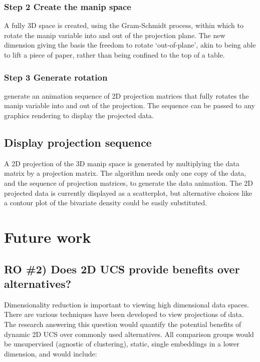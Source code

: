 \documentclass{monashthesis}
\begin{document}
\subsection{Step 2 Create the manip
space}\label{step-2-create-the-manip-space}

A fully 3D space is created, using the Gram-Schmidt process, within
which to rotate the manip variable into and out of the projection plane.
The new dimension giving the basis the freedom to rotate `out-of-plane',
akin to being able to lift a piece of paper, rather than being confined
to the top of a table.

\subsection{Step 3 Generate rotation}\label{step-3-generate-rotation}

generate an animation sequence of 2D projection matrices that fully
rotates the manip variable into and out of the projection. The sequence
can be passed to any graphics rendering to display the projected data.

\section{Display projection sequence}\label{display-projection-sequence}

A 2D projection of the 3D manip space is generated by multiplying the
data matrix by a projection matrix. The algorithm needs only one copy of
the data, and the sequence of projection matrices, to generate the data
animation. The 2D projected data is currently displayed as a
scatterplot, but alternative choices like a contour plot of the
bivariate density could be easily substituted.

\chapter{Future work}\label{ch:future_work}

\section{RO \#2) Does 2D UCS provide benefits over
alternatives?}\label{ro-2-does-2d-ucs-provide-benefits-over-alternatives}

Dimensionality reduction is important to viewing high dimensional data
spaces. There are various techniques have been developed to view
projections of data. The research answering this question would quantify
the potential benefits of dynamic 2D UCS over commonly used
alternatives. All comparison groups would be unsupervised (agnostic of
clustering), static, single embeddings in a lower dimension, and would
include:
\end{document}
